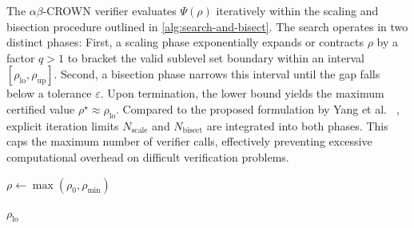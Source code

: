 The $\alpha\beta$-CROWN verifier evaluates $\Psi(\rho)$ iteratively within the scaling and bisection procedure 
outlined in \cref{alg:search-and-bisect}.
The search operates in two distinct phases: 
First, a scaling phase exponentially expands or contracts $\rho$ by a factor $q > 1$ to bracket the valid sublevel set 
boundary within an interval $[\rho_{\mathrm{lo}}, \rho_{\mathrm{up}}]$.
Second, a bisection phase narrows this interval until the gap falls below a tolerance $\varepsilon$. 
Upon termination, the lower bound yields the maximum certified value $\rho^\star \approx \rho_{\mathrm{lo}}$.
Compared to the proposed formulation by Yang et al. ~\cite{yangLyapunovstableNeuralControl2024}, 
explicit iteration limits $N_{\mathrm{scale}}$ and $N_{\mathrm{bisect}}$ are integrated into both phases. 
This caps the maximum number of verifier calls, effectively preventing excessive computational 
overhead on difficult verification problems.

\begin{algorithm}[htpb]
    \caption{Certified Value Search via Scaling and Bisection}
    \label{alg:search-and-bisect}
    \SetAlgoLined

    \BlankLine
    $\rho \leftarrow \max(\rho_0, \rho_{\min})$\;

    \BlankLine

    \BlankLine

    \BlankLine
    \KwRet $\rho_{\mathrm{lo}}$\;
\end{algorithm}
